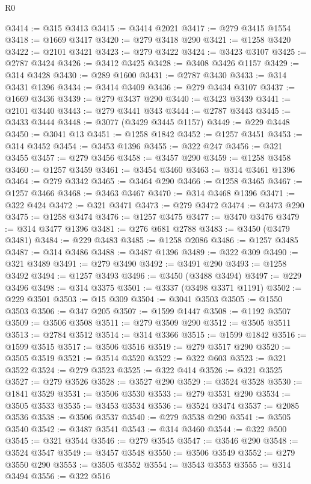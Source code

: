 \begin{lexlean}{R0}
\begin{coremodule}
@3414 := @315 @3413
@3415 := @3414 @2021
@3417 := @279 @3415 @1554
@3418 := @1669 @3417
@3420 := @279 @3418 @290
@3421 := @1258 @3420
@3422 := @2101 @3421
@3423 := @279 @3422
@3424 := @3423 @3107
@3425 := @2787 @3424
@3426 := @3412 @3425
@3428 := @3408 @3426 @1157
@3429 := @314 @3428
@3430 := @289 @1600
@3431 := @2787 @3430
@3433 := @314 @3431 @1396
@3434 := @3414 @3409
@3436 := @279 @3434 @3107
@3437 := @1669 @3436
@3439 := @279 @3437 @290
@3440 := @3423 @3439
@3441 := @2101 @3440
@3443 := @279 @3441 @343
@3444 := @2787 @3443
@3445 := @3433 @3444
@3448 := @3077 (@3429 @3445 @1157)
@3449 := @229 @3448
@3450 := @3041 @13
@3451 := @1258 @1842
@3452 := @1257 @3451
@3453 := @314 @3452
@3454 := @3453 @1396
@3455 := @322 @247
@3456 := @321 @3455
@3457 := @279 @3456
@3458 := @3457 @290
@3459 := @1258 @3458
@3460 := @1257 @3459
@3461 := @3454 @3460
@3463 := @314 @3461 @1396
@3464 := @279 @3342
@3465 := @3464 @290
@3466 := @1258 @3465
@3467 := @1257 @3466
@3468 := @3463 @3467
@3470 := @314 @3468 @1396
@3471 := @322 @424
@3472 := @321 @3471
@3473 := @279 @3472
@3474 := @3473 @290
@3475 := @1258 @3474
@3476 := @1257 @3475
@3477 := @3470 @3476
@3479 := @314 @3477 @1396
@3481 := @276 @681 @2788
@3483 := @3450 (@3479 @3481)
@3484 := @229 @3483
@3485 := @1258 @2086
@3486 := @1257 @3485
@3487 := @314 @3486
@3488 := @3487 @1396
@3489 := @322 @309
@3490 := @321 @3489
@3491 := @279 @3490
@3492 := @3491 @290
@3493 := @1258 @3492
@3494 := @1257 @3493
@3496 := @3450 (@3488 @3494)
@3497 := @229 @3496
@3498 := @314 @3375
@3501 := @3337 (@3498 @3371 @1191)
@3502 := @229 @3501
@3503 := @15 @309
@3504 := @3041 @3503
@3505 := @1550 @3503
@3506 := @347 @205
@3507 := @1599 @1447
@3508 := @1192 @3507
@3509 := @3506 @3508
@3511 := @279 @3509 @290
@3512 := @3505 @3511
@3513 := @2784 @3512
@3514 := @314 @3366
@3515 := @1599 @1842
@3516 := @1599 @3515
@3517 := @3506 @3516
@3519 := @279 @3517 @290
@3520 := @3505 @3519
@3521 := @3514 @3520
@3522 := @322 @603
@3523 := @321 @3522
@3524 := @279 @3523
@3525 := @322 @414
@3526 := @321 @3525
@3527 := @279 @3526
@3528 := @3527 @290
@3529 := @3524 @3528
@3530 := @1841 @3529
@3531 := @3506 @3530
@3533 := @279 @3531 @290
@3534 := @3505 @3533
@3535 := @3453 @3534
@3536 := @3524 @3474
@3537 := @2085 @3536
@3538 := @3506 @3537
@3540 := @279 @3538 @290
@3541 := @3505 @3540
@3542 := @3487 @3541
@3543 := @314 @3460
@3544 := @322 @500
@3545 := @321 @3544
@3546 := @279 @3545
@3547 := @3546 @290
@3548 := @3524 @3547
@3549 := @3457 @3548
@3550 := @3506 @3549
@3552 := @279 @3550 @290
@3553 := @3505 @3552
@3554 := @3543 @3553
@3555 := @314 @3494
@3556 := @322 @516

\end{coremodule}
\end{lexlean}
